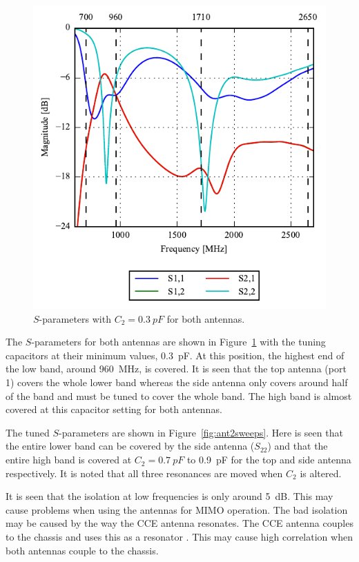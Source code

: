 \begin{figure}[htbp]
    \centering
    \includegraphics{img/tech_sol/trianglefeed/sparams}
    \caption{$S$-parameters with $C_2=\SI{0.3}{pF}$ for both antennas.}
    \label{fig:ant2sparams}
\end{figure}

The $S$-parameters for both antennas are shown in Figure~\ref{fig:ant2sparams} with the tuning capacitors at their minimum values, \SI{0.3}{pF}. At this position, the highest end of the low band, around \SI{960}{MHz}, is covered. It is seen that the top antenna (port 1) covers the whole lower band whereas the side antenna only covers around half of the band and must be tuned to cover the whole band. The high band is almost covered at this capacitor setting for both antennas.

The tuned $S$-parameters are shown in Figure~\ref{fig:ant2sweeps}. Here is seen that the entire lower band can be covered by the side antenna ($S_{22}$) and that the entire high band is covered at $C_2 = \SI{0.7}{pF}$ to \SI{0.9}{pF} for the top and side antenna respectively. It is noted that all three resonances are moved when $C_2$ is altered.

It is seen that the isolation at low frequencies is only around \SI{5}{dB}. This may cause problems when using the antennas for MIMO operation. The bad isolation may be caused by the way the CCE antenna resonates. The CCE antenna couples to the chassis and uses this as a resonator \cite{ilvonen2014design}. This may cause high correlation when both antennas couple to the chassis.

